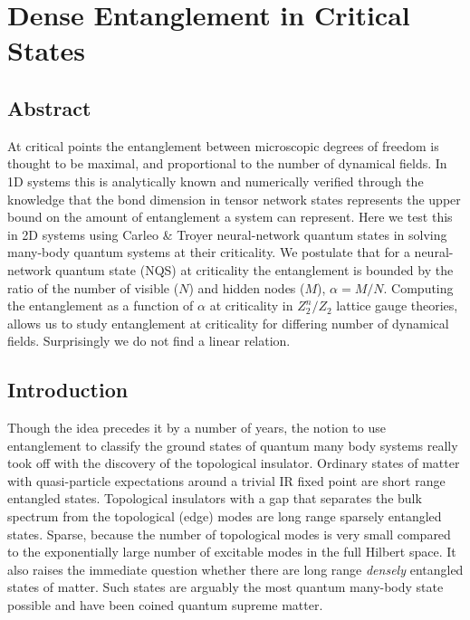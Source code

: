 \chapter{Dense Entanglement in Critical States}
\label{ch:EE}

\section*{Abstract}
	At critical points the entanglement between microscopic degrees of freedom is thought to be maximal, and proportional to the number of dynamical fields. In 1D systems this is analytically known and numerically verified through the knowledge that the bond dimension in tensor network states represents the upper bound on the amount of entanglement a system can represent. Here we test this in 2D systems using Carleo \& Troyer neural-network quantum states in solving many-body quantum systems at their criticality. We postulate that for a neural-network quantum state (NQS) at criticality the entanglement is bounded by the ratio of the number of visible ($N$) and hidden nodes ($M$), $\alpha = M / N$. Computing the entanglement as a function of $\alpha$ at criticality in $Z_2^n/Z_2$ lattice gauge theories, allows us to study entanglement at criticality for differing number of dynamical fields. Surprisingly we do not find a linear relation.
	
\section{Introduction}

Though the idea precedes it by a number of years, the notion to use entanglement to classify the ground states of quantum many body systems really took off with the discovery of the topological insulator. Ordinary states of matter with quasi-particle expectations around a trivial IR fixed point are short range entangled states. Topological insulators with a gap that separates the bulk spectrum from the topological (edge) modes are long range   sparsely entangled states. Sparse, because the number of topological modes is very small compared to the exponentially  large number of  excitable modes in the full Hilbert space. It also raises the immediate question whether there are long range {\em densely} entangled states of matter. Such states are arguably the most quantum many-body state possible and have been coined quantum supreme matter.


